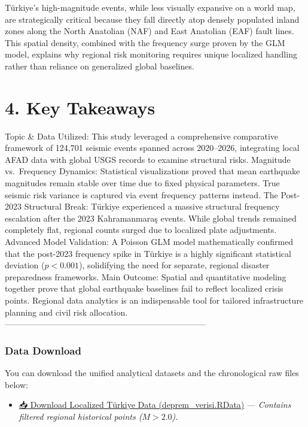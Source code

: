 \documentclass[
  11pt,
  a4paper,
  DIV=11,
  numbers=noendperiod]{scrartcl}
\providecommand{\tightlist}{%
  \setlength{\itemsep}{0pt}\setlength{\parskip}{0pt}}
\begin{document}
Türkiye's high-magnitude events, while less visually expansive on a
world map, are strategically critical because they fall directly atop
densely populated inland zones along the North Anatolian (NAF) and East
Anatolian (EAF) fault lines. This spatial density, combined with the
frequency surge proven by the GLM model, explains why regional risk
monitoring requires unique localized handling rather than reliance on
generalized global baselines.

\section{4. Key Takeaways}\label{key-takeaways}

Topic \& Data Utilized: This study leveraged a comprehensive comparative
framework of 124,701 seismic events spanned across 2020--2026,
integrating local AFAD data with global USGS records to examine
structural risks. Magnitude vs.~Frequency Dynamics: Statistical
visualizations proved that mean earthquake magnitudes remain stable over
time due to fixed physical parameters. True seismic risk variance is
captured via event frequency patterns instead. The Post-2023 Structural
Break: Türkiye experienced a massive structural frequency escalation
after the 2023 Kahramanmaraş events. While global trends remained
completely flat, regional counts surged due to localized plate
adjustments. Advanced Model Validation: A Poisson GLM model
mathematically confirmed that the post-2023 frequency spike in Türkiye
is a highly significant statistical deviation (\(p < 0.001\)),
solidifying the need for separate, regional disaster preparedness
frameworks. Main Outcome: Spatial and quantitative modeling together
prove that global earthquake baselines fail to reflect localized crisis
points. Regional data analytics is an indispensable tool for tailored
infrastructure planning and civil risk allocation.
------------------------------------------------------------------------

\subsubsection{Data Download}\label{data-download}

You can download the unified analytical datasets and the chronological
raw files below:

\begin{itemize}
\tightlist
\item
  \href{data/deprem_verisi.RData}{📥 Download Localized Türkiye Data
  (deprem\_verisi.RData)} --- \emph{Contains filtered regional
  historical points (\(M > 2.0\)).}
\end{itemize}
\end{document}

